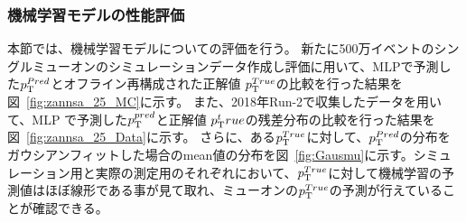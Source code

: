 


\newpage
\subsubsection{機械学習モデルの性能評価}
本節では、機械学習モデルについての評価を行う。
新たに500万イベントのシングルミューオンのシミュレーションデータ作成し評価に用いて、MLPで予測した$p_{\rm{T}}^{Pred}$とオフライン再構成された正解値 $p_{\rm{T}}^{True}$の比較を行った結果を図~\ref{fig:zannsa_25_MC}に示す。
また、2018年Run-2で収集したデータを用いて、MLP で予測した$p_{\rm{T}}^{pred}$と正解値 $p_{\rm{T}}^true$の残差分布の比較を行った結果を図~\ref{fig:zannsa_25_Data}に示す。
さらに、ある$p_{\rm{T}}^{True}$に対して、$p_{\rm{T}}^{Pred}$の分布をガウシアンフィットした場合のmean値の分布を図~\ref{fig:Gausmu}に示す。シミュレーション用と実際の測定用のそれぞれにおいて、$p_{\rm{T}}^{True}$に対して機械学習の予測値はほぼ線形である事が見て取れ、ミューオンの$p_{\rm{T}}^{True}$の予測が行えていることが確認できる。

